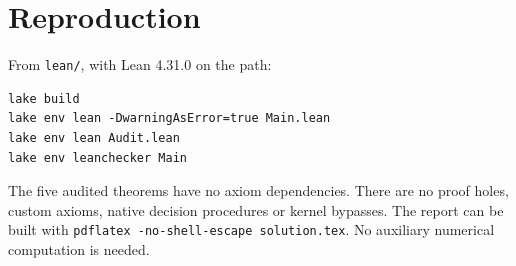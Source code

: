 \documentclass[11pt]{article}
\begin{document}
\section{Reproduction}
From \texttt{lean/}, with Lean 4.31.0 on the path:
\begin{verbatim}
lake build
lake env lean -DwarningAsError=true Main.lean
lake env lean Audit.lean
lake env leanchecker Main
\end{verbatim}
The five audited theorems have no axiom dependencies. There are no proof holes, custom axioms, native decision procedures or kernel bypasses. The report can be built with \texttt{pdflatex -no-shell-escape solution.tex}. No auxiliary numerical computation is needed.
\end{document}
